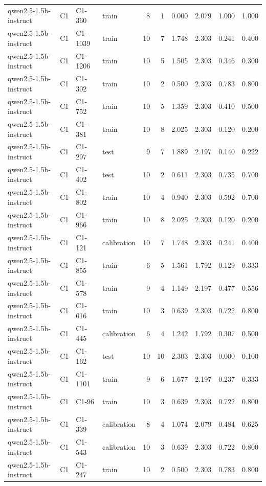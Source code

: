 \begin{table}
\begin{tabular}{llllrrrrrr}
qwen2.5-1.5b-instruct & C1 & C1-360 & train & 8 & 1 & 0.000 & 2.079 & 1.000 & 1.000 \\
qwen2.5-1.5b-instruct & C1 & C1-1039 & train & 10 & 7 & 1.748 & 2.303 & 0.241 & 0.400 \\
qwen2.5-1.5b-instruct & C1 & C1-1206 & train & 10 & 5 & 1.505 & 2.303 & 0.346 & 0.300 \\
qwen2.5-1.5b-instruct & C1 & C1-302 & train & 10 & 2 & 0.500 & 2.303 & 0.783 & 0.800 \\
qwen2.5-1.5b-instruct & C1 & C1-752 & train & 10 & 5 & 1.359 & 2.303 & 0.410 & 0.500 \\
qwen2.5-1.5b-instruct & C1 & C1-381 & train & 10 & 8 & 2.025 & 2.303 & 0.120 & 0.200 \\
qwen2.5-1.5b-instruct & C1 & C1-297 & test & 9 & 7 & 1.889 & 2.197 & 0.140 & 0.222 \\
qwen2.5-1.5b-instruct & C1 & C1-402 & test & 10 & 2 & 0.611 & 2.303 & 0.735 & 0.700 \\
qwen2.5-1.5b-instruct & C1 & C1-802 & train & 10 & 4 & 0.940 & 2.303 & 0.592 & 0.700 \\
qwen2.5-1.5b-instruct & C1 & C1-966 & train & 10 & 8 & 2.025 & 2.303 & 0.120 & 0.200 \\
qwen2.5-1.5b-instruct & C1 & C1-121 & calibration & 10 & 7 & 1.748 & 2.303 & 0.241 & 0.400 \\
qwen2.5-1.5b-instruct & C1 & C1-855 & train & 6 & 5 & 1.561 & 1.792 & 0.129 & 0.333 \\
qwen2.5-1.5b-instruct & C1 & C1-578 & train & 9 & 4 & 1.149 & 2.197 & 0.477 & 0.556 \\
qwen2.5-1.5b-instruct & C1 & C1-616 & train & 10 & 3 & 0.639 & 2.303 & 0.722 & 0.800 \\
qwen2.5-1.5b-instruct & C1 & C1-445 & calibration & 6 & 4 & 1.242 & 1.792 & 0.307 & 0.500 \\
qwen2.5-1.5b-instruct & C1 & C1-162 & test & 10 & 10 & 2.303 & 2.303 & 0.000 & 0.100 \\
qwen2.5-1.5b-instruct & C1 & C1-1101 & train & 9 & 6 & 1.677 & 2.197 & 0.237 & 0.333 \\
qwen2.5-1.5b-instruct & C1 & C1-96 & train & 10 & 3 & 0.639 & 2.303 & 0.722 & 0.800 \\
qwen2.5-1.5b-instruct & C1 & C1-339 & calibration & 8 & 4 & 1.074 & 2.079 & 0.484 & 0.625 \\
qwen2.5-1.5b-instruct & C1 & C1-543 & calibration & 10 & 3 & 0.639 & 2.303 & 0.722 & 0.800 \\
qwen2.5-1.5b-instruct & C1 & C1-247 & train & 10 & 2 & 0.500 & 2.303 & 0.783 & 0.800 \\

\end{tabular}
\end{table}
